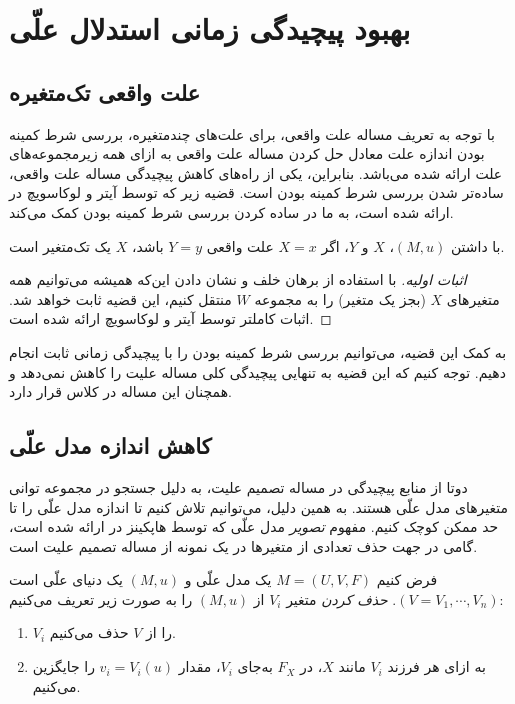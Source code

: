 \section{بهبود پیچیدگی زمانی استدلال علّی}\label{sec:improvements}

\subsection{علت واقعی تک‌متغیره}
با توجه به تعریف مساله علت واقعی،
برای علت‌های چندمتغیره، بررسی شرط کمینه بودن
اندازه علت معادل حل کردن مساله علت واقعی به ازای
همه زیرمجموعه‌های علت ارائه شده می‌باشد.
بنابراین، یکی از راه‌های کاهش پیچیدگی مساله علت واقعی،
ساده‌تر شدن بررسی شرط کمینه بودن است.
قضیه زیر که توسط آیتر و لوکاسویچ در
\cite{eiter2001complexity}
ارائه شده است، به ما در ساده کردن
بررسی شرط کمینه بودن کمک می‌کند.

\begin{theorem}\label{thm:causality-singleton}
  با داشتن
  $(M,u)$،
  $X$ و $Y$،
  اگر
  $X=x$
  علت واقعی
  $Y=y$ باشد،
  $X$
  یک تک‌متغیر است.
\end{theorem}

\begin{proof}[اثبات اولیه]
  با استفاده از برهان خلف و نشان دادن این‌که همیشه
  می‌توانیم همه متغیرهای
  $X$
  (بجز یک متغیر)
  را به مجموعه
  $W$
  منتقل کنیم، این قضیه ثابت خواهد شد.
  اثبات کاملتر توسط آیتر و لوکاسویچ ارائه شده است.
\end{proof}

به کمک این قضیه، می‌توانیم بررسی شرط کمینه بودن را
با پیچیدگی زمانی ثابت انجام دهیم.
توجه کنیم که این قضیه به تنهایی پیچیدگی کلی
مساله علیت را کاهش نمی‌دهد و همچنان این مساله در کلاس
قرار دارد.

\subsection{کاهش اندازه مدل علّی}

دوتا از منابع پیچیدگی در مساله تصمیم علیت،
به دلیل جستجو در مجموعه توانی متغیرهای مدل علّی هستند.
به همین دلیل، می‌توانیم تلاش کنیم تا اندازه مدل علّی را
تا حد ممکن کوچک کنیم. مفهوم
\textit{تصویر}
مدل علّی که توسط هاپکینز در
\cite{hopkins2002strategies}
ارائه شده است،
گامی در جهت حذف تعدادی از متغیرها در
یک نمونه
از مساله تصمیم علیت است.

\begin{definition}\label{def:variable-deletion}
  فرض کنیم
  $M=(U,V,F)$
  یک مدل علّی و
  $(M,u)$
  یک دنیای علّی است
  $(V={V_1,\cdots,V_n})$.
  \textit{حذف کردن}
  متغیر
  $V_i$
  از
  $(M,u)$
  را به صورت زیر تعریف می‌کنیم:
  \begin{enumerate}[label=(\alph*)]
    \item $V_i$
    را از
    $V$
    حذف می‌کنیم.
    \item
    به ازای هر فرزند
    $V_i$
    مانند
    $X$،
    در
    $F_X$
    به‌جای
    $V_i$،
    مقدار
    $v_i=V_i(u)$
    را جایگزین می‌کنیم.
  \end{enumerate}
\end{definition}

